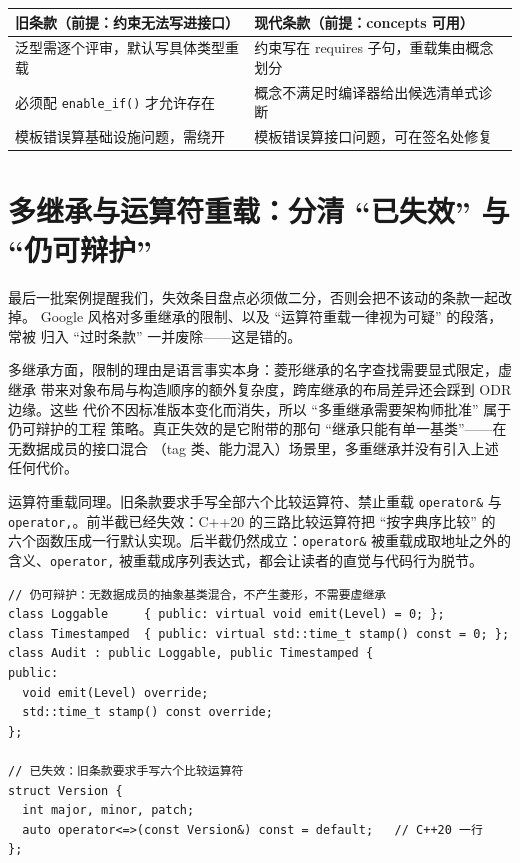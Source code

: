 \documentclass[12pt,a4paper,fontset=fandol]{ctexbook}
\newcommand{\cpp}[1]{C++#1}
\newcommand{\Fn}[1]{\texttt{#1()}}
\newcommand{\Tp}[1]{\texttt{#1}}
\newcommand{\Lang}[1]{\textsf{#1}}
\newcommand{\DomGo}{\Lang{Google}}
\begin{document}
\begin{compare}[title={限制泛型的旧条款 vs 约束接口的现代条款}]
\begin{tabularx}{\linewidth}{>{\raggedright\arraybackslash}X >{\raggedright\arraybackslash}X}
\toprule
旧条款（前提：约束无法写进接口） & 现代条款（前提：concepts 可用） \\
\midrule
泛型需逐个评审，默认写具体类型重载 & 约束写在 requires 子句，重载集由概念划分 \\
必须配 \Fn{enable\_if} 才允许存在 & 概念不满足时编译器给出候选清单式诊断 \\
模板错误算基础设施问题，需绕开 & 模板错误算接口问题，可在签名处修复 \\
\bottomrule
\end{tabularx}
\end{compare}

\section{多继承与运算符重载：分清 ``已失效'' 与 ``仍可辩护''}
\label{sec:ch12-strategy}

最后一批案例提醒我们，失效条目盘点必须做二分，否则会把不该动的条款一起改掉。
\DomGo{} 风格对多重继承的限制、以及 ``运算符重载一律视为可疑'' 的段落，常被
归入 ``过时条款'' 一并废除——这是错的。

多继承方面，限制的理由是语言事实本身：菱形继承的名字查找需要显式限定，虚继承
带来对象布局与构造顺序的额外复杂度，跨库继承的布局差异还会踩到 ODR 边缘。这些
代价不因标准版本变化而消失，所以 ``多重继承需要架构师批准'' 属于仍可辩护的工程
策略。真正失效的是它附带的那句 ``继承只能有单一基类''——在无数据成员的接口混合
（tag 类、能力混入）场景里，多重继承并没有引入上述任何代价。

运算符重载同理。旧条款要求手写全部六个比较运算符、禁止重载 \Tp{operator\&} 与
\Tp{operator,}。前半截已经失效：\cpp{20} 的三路比较运算符把 ``按字典序比较'' 的
六个函数压成一行默认实现。后半截仍然成立：\Tp{operator\&} 被重载成取地址之外的
含义、\Tp{operator,} 被重载成序列表达式，都会让读者的直觉与代码行为脱节。

\begin{lstlisting}[style=cppstyle,caption={两种继承策略与两种重载策略并排},label={lst:ch12-inherit}]
// 仍可辩护：无数据成员的抽象基类混合，不产生菱形，不需要虚继承
class Loggable     { public: virtual void emit(Level) = 0; };
class Timestamped  { public: virtual std::time_t stamp() const = 0; };
class Audit : public Loggable, public Timestamped {
public:
  void emit(Level) override;
  std::time_t stamp() const override;
};

// 已失效：旧条款要求手写六个比较运算符
struct Version {
  int major, minor, patch;
  auto operator<=>(const Version&) const = default;   // C++20 一行
};
\end{lstlisting}
\end{document}
